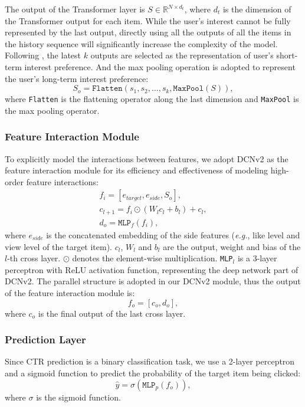 \documentclass[sigconf, nonacm, screen]{acmart}
\begin{document}
The output of the Transformer layer is \(S\in\mathbb{R}^{N\times d_t}\), where \(d_t\) is the dimension of the Transformer output for each item.
While the user's interest cannot be fully represented by the last output, directly using all the outputs of all the items in the history sequence will significantly increase the complexity of the model.
Following \cite{TransAct}, the latest \(k\) outputs are selected as the representation of user's short-term interest preference.
And the max pooling operation is adopted to represent the user's long-term interest preference:
\begin{equation}
    \label{eq:seq}
    S_{o} = \texttt{Flatten}\left(s_1,s_2,\ldots,s_k,\texttt{MaxPool}\left(S\right)\right),
\end{equation}
where \texttt{Flatten} is the flattening operator along the last dimension and \texttt{MaxPool} is the max pooling operator.

\subsubsection{Feature Interaction Module}
To explicitly model the interactions between features, we adopt DCNv2\cite{DCNv2} as the feature interaction module for its efficiency and effectiveness of modeling high-order feature interactions:
\begin{equation}
  \begin{gathered}
  f_i = \left[e_{target}, e_{side}, S_o \right], \\
  c_{l+1} = f_i\odot \left(W_l c_l+b_l\right) + c_l, \\
  d_o = \texttt{MLP}_f\left(f_i\right),
  \end{gathered}
\end{equation}
where \(e_{side}\) is the concatenated embedding of the side features (\emph{e.g.}, like level and view level of the target item). 
\(c_l\), \(W_l\) and \(b_l\) are the output, weight and bias of the \(l\)-th cross layer.
\(\odot\) denotes the element-wise multiplication.
\texttt{MLP}\(_l\) is a 3-layer perceptron with ReLU activation function, representing the deep network part of DCNv2.
The parallel structure is adopted in our DCNv2 module, thus the output of the feature interaction module is:
\begin{equation}
  f_o =\left[c_o, d_o\right],
\end{equation}
where \(c_o\) is the final output of the last cross layer.

\subsubsection{Prediction Layer}
Since CTR prediction is a binary classification task, we use a 2-layer perceptron and a sigmoid function to predict the probability of the target item being clicked:
\begin{equation}
  \hat{y} = \sigma\left(\texttt{MLP}_p\left(f_o\right)\right),
\end{equation}
where \(\sigma\) is the sigmoid function.
\end{document}
